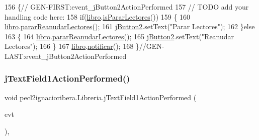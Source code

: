 \begin{DoxyCode}
156                                                                          \{\textcolor{comment}{//
      GEN-FIRST:event\_jButton2ActionPerformed}
157         \textcolor{comment}{// TODO add your handling code here:}
158         \textcolor{keywordflow}{if}(\mbox{\hyperlink{classpecl2ignacioribera_1_1_libreria_afba80788cd6e1d2b13159d886cc3b15d}{libro}}.\mbox{\hyperlink{classpecl2ignacioribera_1_1_libro_a5d5ef2c83d96944b1d043e9fb5378edd}{isPararLectores}}())
159         \{
160             \mbox{\hyperlink{classpecl2ignacioribera_1_1_libreria_afba80788cd6e1d2b13159d886cc3b15d}{libro}}.\mbox{\hyperlink{classpecl2ignacioribera_1_1_libro_aec141b6a8787d8af7f1596a42283d378}{pararReanudarLectores}}();
161             \mbox{\hyperlink{classpecl2ignacioribera_1_1_libreria_a56f076c83a5c4630f48f3f6ccc764d90}{jButton2}}.setText(\textcolor{stringliteral}{"Parar Lectores"});
162         \}\textcolor{keywordflow}{else}
163         \{
164             \mbox{\hyperlink{classpecl2ignacioribera_1_1_libreria_afba80788cd6e1d2b13159d886cc3b15d}{libro}}.\mbox{\hyperlink{classpecl2ignacioribera_1_1_libro_aec141b6a8787d8af7f1596a42283d378}{pararReanudarLectores}}();
165             \mbox{\hyperlink{classpecl2ignacioribera_1_1_libreria_a56f076c83a5c4630f48f3f6ccc764d90}{jButton2}}.setText(\textcolor{stringliteral}{"Reanudar Lectores"});
166         \}
167         \mbox{\hyperlink{classpecl2ignacioribera_1_1_libreria_afba80788cd6e1d2b13159d886cc3b15d}{libro}}.\mbox{\hyperlink{classpecl2ignacioribera_1_1_libro_a44cfbf7f47ada045300c48a3712aa804}{notificar}}();
168     \}\textcolor{comment}{//GEN-LAST:event\_jButton2ActionPerformed}
\end{DoxyCode}
\mbox{\label{classpecl2ignacioribera_1_1_libreria_a31071a27ba4d6f5ff758be176fc744f1}} 
\subsubsection{\texorpdfstring{j\+Text\+Field1\+Action\+Performed()}{jTextField1ActionPerformed()}}
{\footnotesize\ttfamily void pecl2ignacioribera.\+Libreria.\+j\+Text\+Field1\+Action\+Performed (\begin{DoxyParamCaption}\item[{java.\+awt.\+event.\+Action\+Event}]{evt }\end{DoxyParamCaption})\hspace{0.3cm}{\ttfamily [inline]}, {\ttfamily [private]}}


